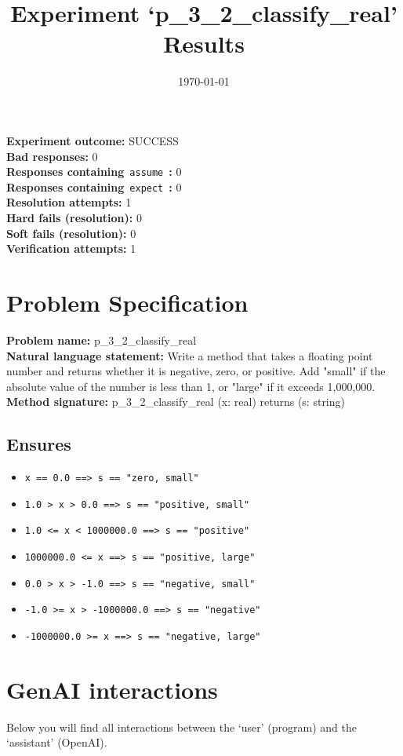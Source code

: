 \documentclass{article}
\begin{document}
\title{Experiment `p\_3\_2\_classify\_real' Results}
\author{\today}
\date{}
\maketitle
\textbf{Experiment outcome: }SUCCESS
\\\textbf{Bad responses: }0
\\\textbf{Responses containing}~\texttt{assume}~\textbf{: }0
\\\textbf{Responses containing}~\texttt{expect}~\textbf{: }0
\\\textbf{Resolution attempts: }1
\\\textbf{Hard fails (resolution): }0
\\\textbf{Soft fails (resolution): }0
\\\textbf{Verification attempts: }1
\section*{Problem Specification}
\textbf{Problem name: }p\_3\_2\_classify\_real
\\\textbf{Natural language statement: }Write a method that takes a floating point number and returns whether it is negative, zero, or positive. Add "small" if the absolute value of the number is less than 1, or "large" if it exceeds 1,000,000.
\\\textbf{Method signature: }p\_3\_2\_classify\_real (x: real) returns (s: string)
\subsection*{Ensures}
\begin{itemize}
\item \texttt{x == 0.0 ==> s == "zero, small"}
\item \texttt{1.0 > x > 0.0 ==> s == "positive, small"}
\item \texttt{1.0 <= x < 1000000.0 ==> s == "positive"}
\item \texttt{1000000.0 <= x  ==> s == "positive, large"}
\item \texttt{0.0 > x > -1.0 ==> s == "negative, small"}
\item \texttt{-1.0 >= x > -1000000.0 ==> s == "negative"}
\item \texttt{-1000000.0 >= x ==> s == "negative, large"}
\end{itemize}
\clearpage
\section*{GenAI interactions}
Below you will find all interactions between the `user' (program) and the `assistant' (OpenAI).
\end{document}
